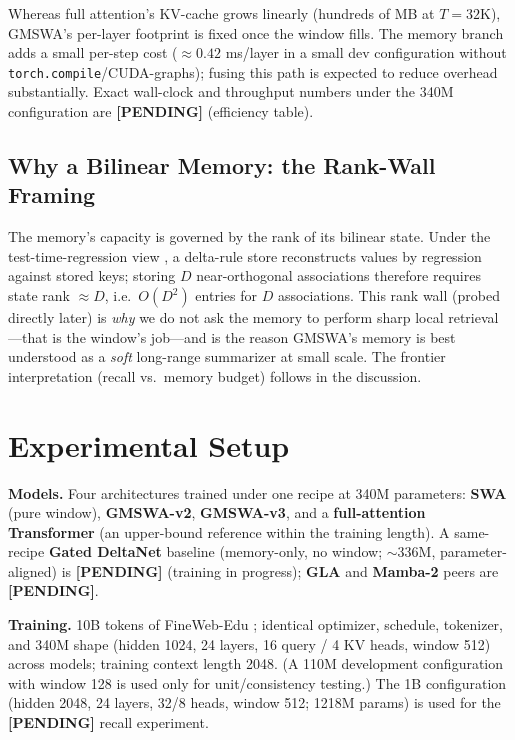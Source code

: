 \documentclass[letterpaper]{article} %
\newcommand{\pending}{\textbf{[PENDING]}}
\begin{document}
Whereas full attention's KV-cache grows linearly (hundreds of MB at $T{=}32$K), GMSWA's per-layer footprint is fixed once the window fills. The memory branch adds a small per-step cost ($\approx 0.42$ ms/layer in a small dev configuration without \texttt{torch.compile}/CUDA-graphs); fusing this path is expected to reduce overhead substantially. Exact wall-clock and throughput numbers under the 340M configuration are \pending{} (efficiency table).

\subsection{Why a Bilinear Memory: the Rank-Wall Framing}
The memory's capacity is governed by the rank of its bilinear state. Under the test-time-regression view \citep{ttr2025}, a delta-rule store reconstructs values by regression against stored keys; storing $D$ near-orthogonal associations therefore requires state rank $\approx D$, i.e.\ $O(D^2)$ entries for $D$ associations. This rank wall (probed directly later) is \emph{why} we do not ask the memory to perform sharp local retrieval---that is the window's job---and is the reason GMSWA's memory is best understood as a \emph{soft} long-range summarizer at small scale. The frontier interpretation (recall vs.\ memory budget) follows in the discussion.

\section{Experimental Setup}
\textbf{Models.} Four architectures trained under one recipe at 340M parameters: \textbf{SWA} (pure window), \textbf{GMSWA-v2}, \textbf{GMSWA-v3}, and a \textbf{full-attention Transformer} (an upper-bound reference within the training length). A same-recipe \textbf{Gated DeltaNet} baseline (memory-only, no window; ${\sim}336$M, parameter-aligned) is \pending{} (training in progress); \textbf{GLA} and \textbf{Mamba-2} peers are \pending{}.

\textbf{Training.} 10B tokens of FineWeb-Edu \citep{finewebedu}; identical optimizer, schedule, tokenizer, and 340M shape (hidden 1024, 24 layers, 16 query / 4 KV heads, window 512) across models; training context length 2048. (A 110M development configuration with window 128 is used only for unit/consistency testing.) The 1B configuration (hidden 2048, 24 layers, 32/8 heads, window 512; 1218M params) is used for the \pending{} recall experiment.
\end{document}

